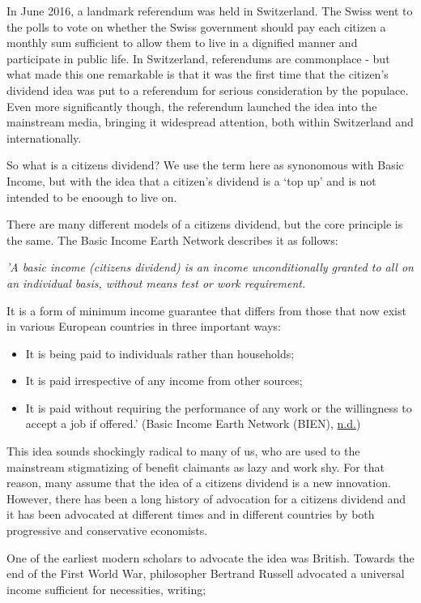 \documentclass[]{tufte-handout}
\providecommand{\tightlist}{%
  \setlength{\itemsep}{0pt}\setlength{\parskip}{0pt}}
\begin{document}
In June 2016, a landmark referendum was held in Switzerland. The Swiss
went to the polls to vote on whether the Swiss government should pay
each citizen a monthly sum sufficient to allow them to live in a
dignified manner and participate in public life. In Switzerland,
referendums are commonplace - but what made this one remarkable is that
it was the first time that the citizen's dividend idea was put to a
referendum for serious consideration by the populace. Even more
significantly though, the referendum launched the idea into the
mainstream media, bringing it widespread attention, both within
Switzerland and internationally.

So what is a citizens dividend? We use the term here as synonomous with
Basic Income, but with the idea that a citizen's dividend is a `top up'
and is not intended to be enoough to live on.

There are many different models of a citizens dividend, but the core
principle is the same. The Basic Income Earth Network describes it as
follows:

\emph{'A basic income (citizens dividend) is an income unconditionally
granted to all on an individual basis, without means test or work
requirement.}

It is a form of minimum income guarantee that differs from those that
now exist in various European countries in three important ways:

\begin{itemize}
\tightlist
\item
  It is being paid to individuals rather than households;
\item
  It is paid irrespective of any income from other sources;
\item
  It is paid without requiring the performance of any work or the
  willingness to accept a job if offered.' (Basic Income Earth Network
  (BIEN), \protect\hyperlink{ref-BasicIncomeEarthNetworkBIEN}{n.d.})
\end{itemize}

This idea sounds shockingly radical to many of us, who are used to the
mainstream stigmatizing of benefit claimants as lazy and work shy. For
that reason, many assume that the idea of a citizens dividend is a new
innovation. However, there has been a long history of advocation for a
citizens dividend and it has been advocated at different times and in
different countries by both progressive and conservative economists.

One of the earliest modern scholars to advocate the idea was British.
Towards the end of the First World War, philosopher Bertrand Russell
advocated a universal income sufficient for necessities, writing;
\end{document}
